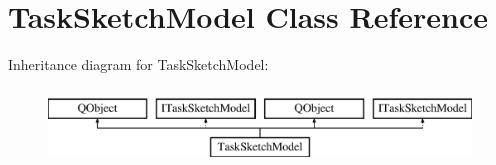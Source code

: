 \hypertarget{class_task_sketch_model}{}\section{Task\+Sketch\+Model Class Reference}
\label{class_task_sketch_model}
Inheritance diagram for Task\+Sketch\+Model\+:\begin{figure}[H]
\begin{center}
\leavevmode
\includegraphics[height=2.000000cm]{class_task_sketch_model}
\end{center}
\end{figure}
